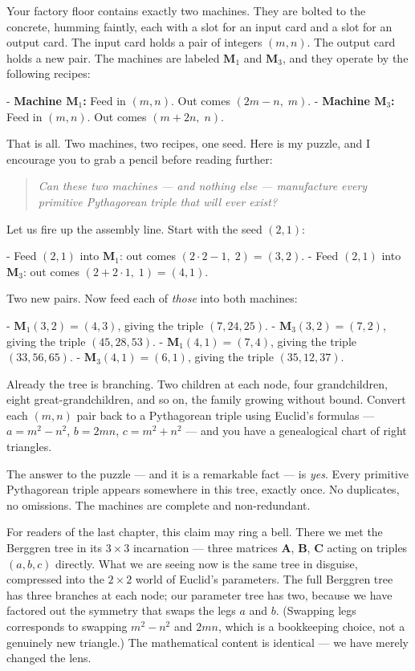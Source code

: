 Your factory floor contains exactly two machines. They are bolted to the concrete, humming faintly, each with a slot for an input card and a slot for an output card. The input card holds a pair of integers $(m, n)$. The output card holds a new pair. The machines are labeled $\mathbf{M}_1$ and $\mathbf{M}_3$, and they operate by the following recipes:

- \textbf{Machine $\mathbf{M}_1$:} Feed in $(m, n)$. Out comes $(2m - n,\; m)$.
- \textbf{Machine $\mathbf{M}_3$:} Feed in $(m, n)$. Out comes $(m + 2n,\; n)$.

That is all. Two machines, two recipes, one seed. Here is my puzzle, and I encourage you to grab a pencil before reading further:


\begin{quote}
\itshape
\textit{Can these two machines --- and nothing else --- manufacture every primitive Pythagorean triple that will ever exist?}
\end{quote}


Let us fire up the assembly line. Start with the seed $(2, 1)$:

- Feed $(2, 1)$ into $\mathbf{M}_1$: out comes $(2 \cdot 2 - 1,\; 2) = (3, 2)$.
- Feed $(2, 1)$ into $\mathbf{M}_3$: out comes $(2 + 2 \cdot 1,\; 1) = (4, 1)$.

Two new pairs. Now feed each of \textit{those} into both machines:

- $\mathbf{M}_1(3, 2) = (4, 3)$, giving the triple $(7, 24, 25)$.
- $\mathbf{M}_3(3, 2) = (7, 2)$, giving the triple $(45, 28, 53)$.
- $\mathbf{M}_1(4, 1) = (7, 4)$, giving the triple $(33, 56, 65)$.
- $\mathbf{M}_3(4, 1) = (6, 1)$, giving the triple $(35, 12, 37)$.

Already the tree is branching. Two children at each node, four grandchildren, eight great-grandchildren, and so on, the family growing without bound. Convert each $(m, n)$ pair back to a Pythagorean triple using Euclid's formulas --- $a = m^2 - n^2$, $b = 2mn$, $c = m^2 + n^2$ --- and you have a genealogical chart of right triangles.


The answer to the puzzle --- and it is a remarkable fact --- is \textit{yes}. Every primitive Pythagorean triple appears somewhere in this tree, exactly once. No duplicates, no omissions. The machines are complete and non-redundant.

For readers of the last chapter, this claim may ring a bell. There we met the Berggren tree in its $3 \times 3$ incarnation --- three matrices $\mathbf{A}$, $\mathbf{B}$, $\mathbf{C}$ acting on triples $(a, b, c)$ directly. What we are seeing now is the same tree in disguise, compressed into the $2 \times 2$ world of Euclid's parameters. The full Berggren tree has three branches at each node; our parameter tree has two, because we have factored out the symmetry that swaps the legs $a$ and $b$. (Swapping legs corresponds to swapping $m^2 - n^2$ and $2mn$, which is a bookkeeping choice, not a genuinely new triangle.) The mathematical content is identical --- we have merely changed the lens.

